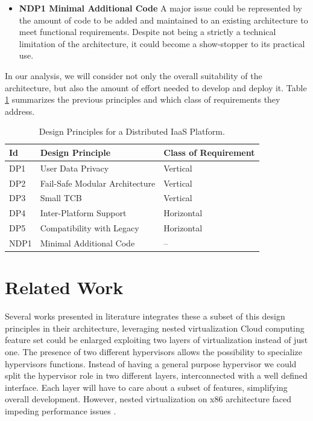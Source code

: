 \documentclass{sig-alternate}
\begin{document}
\begin{itemize}[]
\item \textbf{NDP1 Minimal Additional Code} A major issue could be represented by the amount of code to be added and maintained to an existing architecture to meet functional requirements. Despite not being a strictly a technical limitation of the architecture, it could become a show-stopper to its practical use.
\end{itemize}
In our analysis, we will consider not only the overall suitability of the architecture, but also the amount of effort needed to develop and deploy it. Table \ref{int:des} summarizes the previous principles and which class of requirements they address.
 
\begin{table}
\caption{Design Principles for a Distributed IaaS Platform.\label{int:des}}
\begin{tabular}{lll}
\toprule
\textbf{Id} & \textbf{Design Principle} & \textbf{Class of Requirement} \\
\midrule
DP1 & User Data Privacy & Vertical \\
DP2 & Fail-Safe Modular Architecture & Vertical \\ 
DP3 & Small TCB & Vertical \\
DP4 & Inter-Platform Support & Horizontal \\
DP5 & Compatibility with Legacy & Horizontal \\
NDP1 & Minimal Additional Code & -- \\
\bottomrule
\end{tabular}
\end{table}
 
\section{Related Work}
\label{sec:rw}

Several works presented in literature integrates these a subset of this design principles in their architecture, leveraging nested virtualization \cite{turtle:ibm,art:blan, cloudvisor:zhang}
Cloud computing feature set could be enlarged exploiting two layers of virtualization instead of just one. The presence of two different hypervisors allows the possibility to specialize hypervisors functions. Instead of having a general purpose hypervisor we could split the hypervisor role in two different layers, interconnected with a well defined interface.
Each layer will have to care about a subset of features, simplifying overall development.
However, nested virtualization on x86 architecture faced impeding performance issues \cite{rec:virt}.
\end{document}
